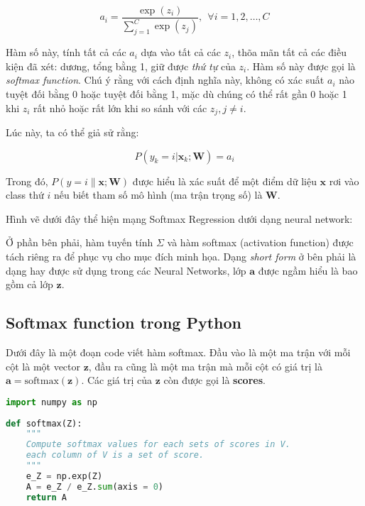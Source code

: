 \begin{equation*} 
a_i = \frac{\exp(z_i)}{\sum_{j=1}^C \exp(z_j)}, ~~ \forall i = 1, 2, \dots, C 
\end{equation*} 
 
Hàm số này, tính tất cả các $a_i$ dựa vào tất cả các $z_i$, thõa mãn tất cả các điều kiện đã xét: dương, tổng bằng 1, giữ được \textit{thứ tự} của $z_i$. Hàm số này được gọi là \textit{softmax function}. Chú ý rằng với cách định nghĩa này, không có xác suất $a_i$ nào tuyệt đối bằng 0 hoặc tuyệt đối bằng 1, mặc dù chúng có thể rất gần 0 hoặc 1 khi $z_i$ rất nhỏ hoặc rất lớn khi so sánh với các $z_j, j \neq i$. 
 
Lúc này, ta có thể giả sử rằng: 
 
\begin{equation*} 
P(y_k = i | \mathbf{x}_k; \mathbf{W}) = a_i 
\end{equation*} 
 
Trong đó, $P(y = i \| \mathbf{x}; \mathbf{W})$ được hiểu là xác suất để một điểm dữ liệu $\mathbf{x}$ rơi vào class thứ $i$ nếu biết tham số mô hình (ma trận trọng số) là $\mathbf{W}$.  
 
 
Hình vẽ dưới đây thể hiện mạng Softmax Regression dưới dạng neural network: 
 
Ở phần bên phải, hàm tuyến tính $\Sigma$ và hàm softmax (activation function) được tách riêng ra để phục vụ cho mục đích minh họa. Dạng \textit{short form} ở bên phải là dạng hay được sử dụng trong các Neural Networks, lớp $\mathbf{a}$ được ngầm hiểu là bao gồm cả lớp $\mathbf{z}$. 
 
 
 
 
\subsection{Softmax function trong Python }
Dưới đây là một đoạn code viết hàm softmax. Đầu vào là một ma trận với mỗi cột là một vector $\mathbf{z}$, đầu ra cũng là một ma trận mà mỗi cột có giá trị là $\mathbf{a} = \text{softmax}(\mathbf{z})$. Các giá trị của $\mathbf{z}$ còn được gọi là \textbf{scores}. 
 
\begin{lstlisting}[language=Python]
import numpy as np  
 
def softmax(Z): 
    """ 
    Compute softmax values for each sets of scores in V. 
    each column of V is a set of score.     
    """ 
    e_Z = np.exp(Z) 
    A = e_Z / e_Z.sum(axis = 0) 
    return A 
\end{lstlisting}
 
